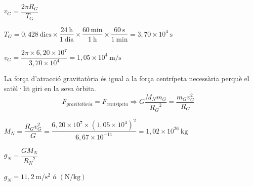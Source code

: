 \begin{solapartat}
 $v_G = \dfrac{2\pi R_G}{T_G}$

 $T_G = 0,428\ \text{dies}\times\dfrac{24\ \mathrm{h}}{1\ \text{dia}}\times\dfrac{60\ \mathrm{min}}{1\ \mathrm{h}}\times\dfrac{60\ \mathrm{s}}{1\ \mathrm{min}} = 3,70\times 10^{4}\ \mathrm{s}$

 $v_G = \dfrac{2\pi\times 6,20\times 10^{7}}{3,70\times 10^{4}} = 1,05\times 10^{4}\ \mathrm{m/s}$

 La força d'atracció gravitatòria és igual a la força centrípeta necessària perquè el satèl·lit giri en la seva òrbita.
\[ F_{\textit{gravitatòria}} = F_{\textit{centrípeta}} \Rightarrow G\frac{M_N m_G}{{R_G}^2} = \frac{m_G v_G^2}{R_G} \]

 $M_N = \dfrac{R_G v_G^2}{G} = \dfrac{6,20\times 10^{7}\times\left(1,05\times 10^{4}\right)^2}{6,67\times 10^{-11}} = 1,02\times 10^{26}\ \mathrm{kg}$
\end{solapartat}

\begin{solapartat}
 $g_N = \dfrac{GM_N}{{R_N}^2}$

 $g_N = 11,2\ \mathrm{m/s^2}$ ó $(\mathrm{N/kg})$
\end{solapartat}
